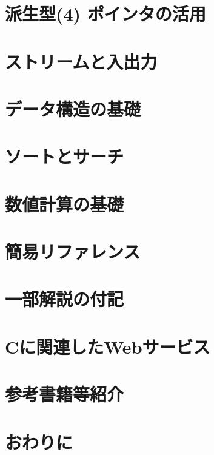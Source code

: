 \documentclass[a4j,12pt]{jreport}
\makeatletter
\renewcommand{\postchaptername}{講}
\newcommand{\beginappendix}{
  \setcounter{chapter}{0}
  \renewcommand{\prechaptername}{付録}
  \renewcommand{\postchaptername}{} 
  \renewcommand{\thechapter}{\@Alph\c@chapter}
  \renewcommand{\thesection}{\@Alph\c@chapter.\@arabic\c@section}
  \renewcommand{\thesubsection}{\@Alph\c@chapter.\@arabic\c@section.\@arabic\c@subsection}
}
\makeatother
\begin{document}
\chapter{派生型(4) ポインタの活用}


\chapter{ストリームと入出力}


\chapter{データ構造の基礎}


\chapter{ソートとサーチ}


\chapter{数値計算の基礎}


\beginappendix
\chapter{簡易リファレンス}



\chapter{一部解説の付記}


\chapter{Cに関連したWebサービス}


\chapter*{参考書籍等紹介}


\chapter*{おわりに}


\printindex
\end{document}
